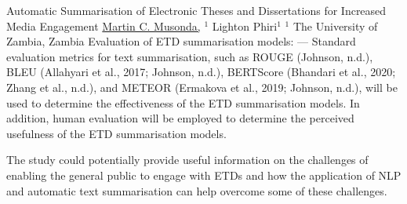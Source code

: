 \begin{abstract_online}{Automatic Summarisation of Electronic Theses and Dissertations for Increased Media Engagement}{%
    \underline{Martin C. Musonda,} $^{1}$ Lighton Phiri$^{1}$}{%
    }{%
    $^1$ The University of Zambia, Zambia}
Evaluation of ETD summarisation models: — Standard evaluation metrics for text summarisation, such as ROUGE (Johnson, n.d.), BLEU (Allahyari et al., 2017; Johnson, n.d.), BERTScore (Bhandari et al., 2020; Zhang et al., n.d.), and METEOR (Ermakova et al., 2019; Johnson, n.d.), will be used to determine the effectiveness of the ETD summarisation models. In addition, human evaluation will be employed to determine the perceived usefulness of the ETD summarisation models.

The study could potentially provide useful information on the challenges of enabling the general public to engage with ETDs and how the application of NLP and automatic text summarisation can help overcome some of these challenges.

\end{abstract_online}

